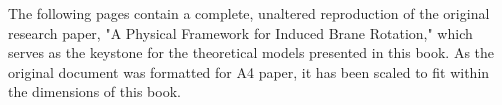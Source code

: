 \documentclass[11pt,twoside,openany]{book}
\begin{document}
The following pages contain a complete, unaltered reproduction of the original research paper, "A Physical Framework for Induced Brane Rotation," which serves as the keystone for the theoretical models presented in this book. As the original document was formatted for A4 paper, it has been scaled to fit within the dimensions of this book.

\newpage




\backmatter

\printbibliography[heading=bibintoc,title={Bibliography}]





\end{document}
